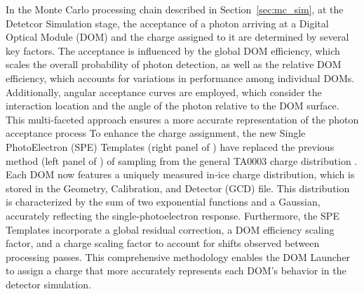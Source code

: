 In the Monte Carlo processing chain described in Section~\ref{sec:mc_sim}, at the Detetcor Simulation stage, the acceptance of a photon arriving at a Digital Optical Module (DOM) and the charge assigned to it are determined by several key factors. The acceptance is influenced by the global DOM efficiency, which scales the overall probability of photon detection, as well as the relative DOM efficiency, which accounts for variations in performance among individual DOMs. Additionally, angular acceptance curves are employed, which consider the interaction location and the angle of the photon relative to the DOM surface. This multi-faceted approach ensures a more accurate representation of the photon acceptance process
To enhance the charge assignment, the new Single PhotoElectron (SPE) Templates (right panel of ) have replaced the previous method (left panel of ) of sampling from the general TA0003 charge distribution . Each DOM now features a uniquely measured in-ice charge distribution, which is stored in the Geometry, Calibration, and Detector (GCD) file. This distribution is characterized by the sum of two exponential functions and a Gaussian, accurately reflecting the single-photoelectron response. Furthermore, the SPE Templates incorporate a global residual correction, a DOM efficiency scaling factor, and a charge scaling factor to account for shifts observed between processing passes. This comprehensive methodology enables the DOM Launcher to assign a charge that more accurately represents each DOM's behavior in the detector simulation.

